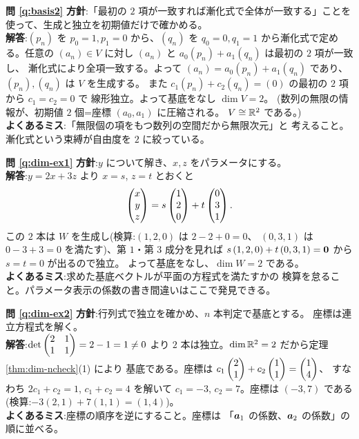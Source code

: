 \bigskip
\noindent\textbf{問 \ref{q:basis2}}\quad
\textbf{方針}:「最初の $2$ 項が一致すれば漸化式で全体が一致する」ことを
使って、生成と独立を初期値だけで確かめる。\\
\textbf{解答}:$(p_n)$ を $p_0 = 1, p_1 = 0$ から、$(q_n)$ を
$q_0 = 0, q_1 = 1$ から漸化式で定める。任意の $(a_n) \in V$ に対し
$(a_n)$ と $a_0 (p_n) + a_1 (q_n)$ は最初の $2$ 項が一致し、
漸化式により全項一致する。よって $(a_n) = a_0(p_n) + a_1(q_n)$ であり、
$(p_n), (q_n)$ は $V$ を生成する。
また $c_1(p_n) + c_2(q_n) = (0)$ の最初の $2$ 項から $c_1 = c_2 = 0$ で
線形独立。よって基底をなし $\dim V = 2$。
(数列の無限の情報が、初期値 $2$ 個=座標 $(a_0, a_1)$ に圧縮される。
$V \cong \mathbb{R}^2$ である。)\\
\textbf{よくあるミス}:「無限個の項をもつ数列の空間だから無限次元」と
考えること。漸化式という束縛が自由度を $2$ に絞っている。

\bigskip
\noindent\textbf{問 \ref{q:dim-ex1}}\quad
\textbf{方針}:$y$ について解き、$x, z$ をパラメータにする。\\
\textbf{解答}:$y = 2x + 3z$ より $x = s$, $z = t$ とおくと
\[
\begin{pmatrix}x \\ y \\ z\end{pmatrix} = s\begin{pmatrix}1 \\ 2 \\ 0\end{pmatrix} + t\begin{pmatrix}0 \\ 3 \\ 1\end{pmatrix}.
\]
この $2$ 本は $W$ を生成し(検算:$(1,2,0)$ は $2 - 2 + 0 = 0$、
$(0,3,1)$ は $0 - 3 + 3 = 0$ を満たす)、第 $1$・第 $3$ 成分を見れば
$s\,(1,2,0) + t\,(0,3,1) = \bm{0}$ から $s = t = 0$ が出るので独立。
よって基底をなし、$\dim W = 2$ である。\\
\textbf{よくあるミス}:求めた基底ベクトルが平面の方程式を満たすかの
検算を怠ること。パラメータ表示の係数の書き間違いはここで発見できる。

\bigskip
\noindent\textbf{問 \ref{q:dim-ex2}}\quad
\textbf{方針}:行列式で独立を確かめ、$n$ 本判定で基底とする。
座標は連立方程式を解く。\\
\textbf{解答}:$\det \begin{pmatrix}2 & 1 \\ 1 & 1\end{pmatrix} = 2 - 1 = 1 \neq 0$ より
$2$ 本は独立。$\dim \mathbb{R}^2 = 2$ だから定理 \ref{thm:dim-ncheck}(1) により
基底である。座標は $c_1\begin{pmatrix}2 \\ 1\end{pmatrix} + c_2\begin{pmatrix}1 \\ 1\end{pmatrix} = \begin{pmatrix}1 \\ 4\end{pmatrix}$、
すなわち $2c_1 + c_2 = 1$, $c_1 + c_2 = 4$ を解いて
$c_1 = -3$, $c_2 = 7$。座標は $(-3, 7)$ である
(検算:$-3(2,1) + 7(1,1) = (1, 4)$)。\\
\textbf{よくあるミス}:座標の順序を逆にすること。座標は
「$\bm{a}_1$ の係数、$\bm{a}_2$ の係数」の順に並べる。

